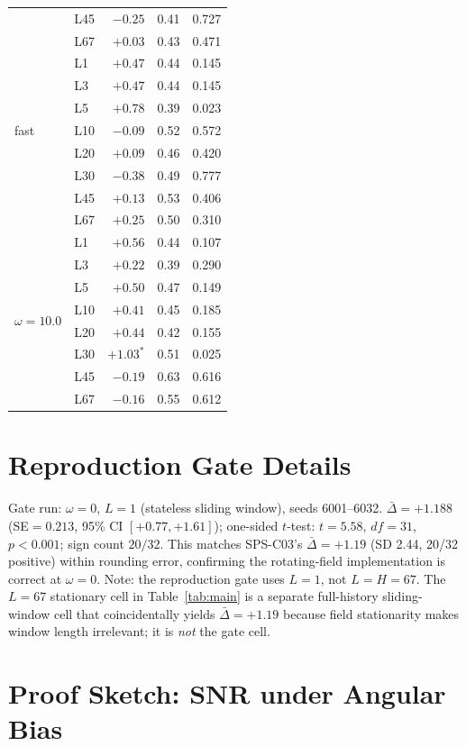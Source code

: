 \documentclass[sigconf,anonymous]{aamas}
\newcommand{\Dbar}{\bar{\Delta}}
\begin{document}
\begin{table}[h]
{\begin{tabular}{llrrr}
  & L45 & $-0.25$   & 0.41 & 0.727 \\
  & L67 & $+0.03$   & 0.43 & 0.471 \\
\midrule
\multirow{7}{*}{fast}
  & L1  & $+0.47$ & 0.44 & 0.145 \\
  & L3  & $+0.47$ & 0.44 & 0.145 \\
  & L5  & $+0.78$ & 0.39 & 0.023 \\
  & L10 & $-0.09$ & 0.52 & 0.572 \\
  & L20 & $+0.09$ & 0.46 & 0.420 \\
  & L30 & $-0.38$ & 0.49 & 0.777 \\
  & L45 & $+0.13$ & 0.53 & 0.406 \\
  & L67 & $+0.25$ & 0.50 & 0.310 \\
\midrule
\multirow{8}{*}{$\omega{=}10.0$}
  & L1  & $+0.56$ & 0.44 & 0.107 \\
  & L3  & $+0.22$ & 0.39 & 0.290 \\
  & L5  & $+0.50$ & 0.47 & 0.149 \\
  & L10 & $+0.41$ & 0.45 & 0.185 \\
  & L20 & $+0.44$ & 0.42 & 0.155 \\
  & L30 & $+1.03^*$ & 0.51 & 0.025 \\
  & L45 & $-0.19$ & 0.63 & 0.616 \\
  & L67 & $-0.16$ & 0.55 & 0.612 \\
\bottomrule
\end{tabular}
}
\end{table}

\section{Reproduction Gate Details}
\label{app:gate}

Gate run: $\omega{=}0$, $L{=}1$ (stateless sliding window), seeds 6001--6032.
$\Dbar{=}{+}1.188$ (SE${}=0.213$, 95\% CI $[+0.77, +1.61]$);
one-sided $t$-test: $t{=}5.58$, $df{=}31$, $p{<}0.001$;
sign count $20/32$.
This matches SPS-C03's $\Dbar{=}{+}1.19$ (SD 2.44, 20/32 positive)
within rounding error, confirming the rotating-field implementation
is correct at $\omega{=}0$.
Note: the reproduction gate uses $L{=}1$, not $L{=}H{=}67$.
The $L{=}67$ stationary cell in Table~\ref{tab:main} is a
separate full-history sliding-window cell that coincidentally
yields $\Dbar{=}{+}1.19$ because field stationarity makes window
length irrelevant; it is \emph{not} the gate cell.

\section{Proof Sketch: SNR under Angular Bias}
\label{app:theory}
\end{document}
